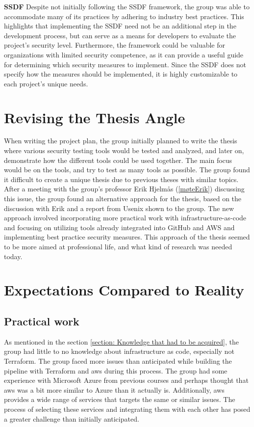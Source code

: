 \textbf{SSDF}
Despite not initially following the SSDF framework, the group was able to accommodate many of its practices by adhering to industry best practices. This highlights that implementing the SSDF need not be an additional step in the development process, but can serve as a means for developers to evaluate the project's security level. Furthermore, the framework could be valuable for organizations with limited security competence, as it can provide a useful guide for determining which security measures to implement. Since the SSDF does not specify how the measures should be implemented, it is highly customizable to each project's unique needs. 

\section{Revising the Thesis Angle}
When writing the project plan, the group initially planned to write the thesis where various security testing tools would be tested and analyzed, and later on, demonstrate how the different tools could be used together. The main focus would be on the tools, and try to test as many tools as possible. The group found it difficult to create a unique thesis due to previous theses with similar topics. 
\\
After a meeting with the group's professor Erik Hjelmås  (\ref{møteErik}) discussing this issue, the group found an alternative approach for the thesis, based on the discussion with Erik and a report from Usenix \cite{usenixreport} shown to the group. The new approach involved incorporating more practical work with infrastructure-as-code and focusing on utilizing tools already integrated into GitHub and AWS and implementing best practice security measures. This approach of the thesis seemed to be more aimed at professional life, and what kind of research was needed today.  


\section{Expectations Compared to Reality}
\subsection{Practical work}
As mentioned in the section \ref{section: Knowledge that had to be acquired}, the group had little to no knowledge about \gls{infrastructure as code}, especially not Terraform. The group faced more issues than anticipated while building the pipeline with Terraform and \acrshort{aws} during this process.
The group had some experience with Microsoft Azure from previous courses and perhaps thought that \acrshort{aws} was a bit more similar to Azure than it actually is. Additionally, \acrshort{aws} provides a wide range of services that targets the same or similar issues. The process of selecting these services and integrating them with each other has posed a greater challenge than initially anticipated. 



